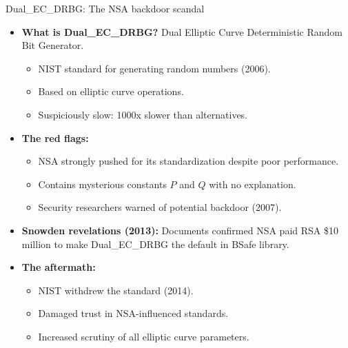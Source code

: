 \documentclass[aspectratio=169, lualatex, handout]{beamer}
\begin{document}
\begin{frame}{Dual\_EC\_DRBG: The NSA backdoor scandal}
	\begin{itemize}
		\item \textbf{What is Dual\_EC\_DRBG?} Dual Elliptic Curve Deterministic Random Bit Generator.
		      \begin{itemize}
			      \item NIST standard for generating random numbers (2006).
			      \item Based on elliptic curve operations.
			      \item Suspiciously slow: 1000x slower than alternatives.
		      \end{itemize}
		\item \textbf{The red flags:}
		      \begin{itemize}
			      \item NSA strongly pushed for its standardization despite poor performance.
			      \item Contains mysterious constants $P$ and $Q$ with no explanation.
			      \item Security researchers warned of potential backdoor (2007).
		      \end{itemize}
		\item \textbf{Snowden revelations (2013):} Documents confirmed NSA paid RSA \$10 million to make Dual\_EC\_DRBG the default in BSafe library.
		\item \textbf{The aftermath:}
		      \begin{itemize}
			      \item NIST withdrew the standard (2014).
			      \item Damaged trust in NSA-influenced standards.
			      \item Increased scrutiny of all elliptic curve parameters.
		      \end{itemize}
	\end{itemize}
\end{frame}
\end{document}
